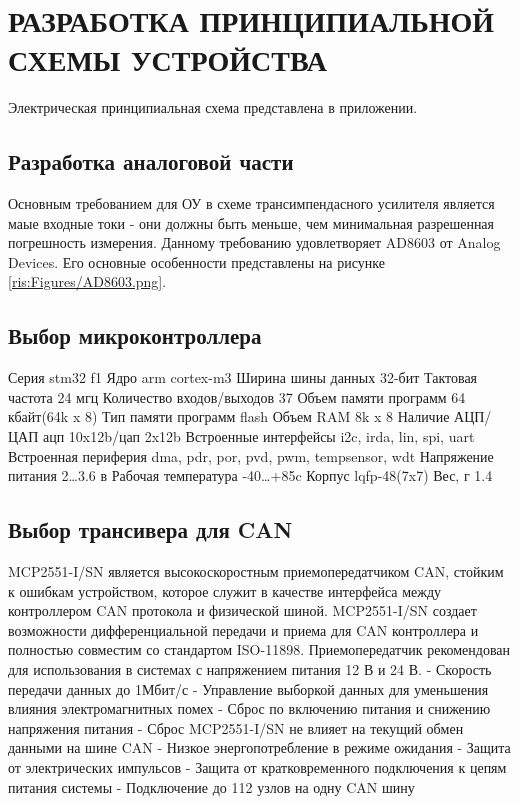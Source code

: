 \begin{sloppypar} %
\newpage %
\section{РАЗРАБОТКА ПРИНЦИПИАЛЬНОЙ СХЕМЫ УСТРОЙСТВА} %
Электрическая принципиальная схема представлена в приложении.
\subsection{Разработка аналоговой части}
Основным требованием для ОУ в схеме трансимпендасного усилителя является маые входные токи - они должны быть меньше, чем минимальная разрешенная погрешность измерения. Данному требованию удовлетворяет AD8603 от Analog Devices.
Его основные особенности представлены на рисунке \ref{ris:Figures/AD8603.png}.


\subsection{Выбор микроконтроллера}
Серия	stm32 f1	
Ядро	arm cortex-m3	
Ширина шины данных	32-бит	
Тактовая частота	24 мгц	
Количество входов/выходов	37	
Объем памяти программ	64 кбайт(64k x 8)	
Тип памяти программ	flash	
Объем RAM	8k x 8	
Наличие АЦП/ЦАП	ацп 10x12b/цап 2x12b	
Встроенные интерфейсы	i2c, irda, lin, spi, uart	
Встроенная периферия	dma, pdr, por, pvd, pwm, tempsensor, wdt	
Напряжение питания	2…3.6 в	
Рабочая температура	-40…+85c	
Корпус	lqfp-48(7x7)	
Вес, г	1.4



\subsection{Выбор трансивера для CAN}






MCP2551-I/SN \cite{CAN}является высокоскоростным приемопередатчиком  CAN, стойким к ошибкам устройством, которое служит в качестве интерфейса между контроллером CAN протокола и физической шиной.
MCP2551-I/SN создает возможности дифференциальной передачи и приема для CAN контроллера и полностью совместим со стандартом ISO-11898.
Приемопередатчик рекомендован для использования в системах с напряжением питания 12 В и 24 В.
- Скорость передачи данных до 1Мбит/с
- Управление выборкой данных для уменьшения влияния электромагнитных помех
- Сброс по включению питания и снижению напряжения питания
- Сброс MCP2551-I/SN не влияет на текущий обмен данными на шине CAN - Низкое энергопотребление в режиме ожидания
- Защита от электрических импульсов
- Защита от кратковременного подключения к цепям питания системы
- Подключение до 112 узлов на одну CAN шину






\end{sloppypar}
